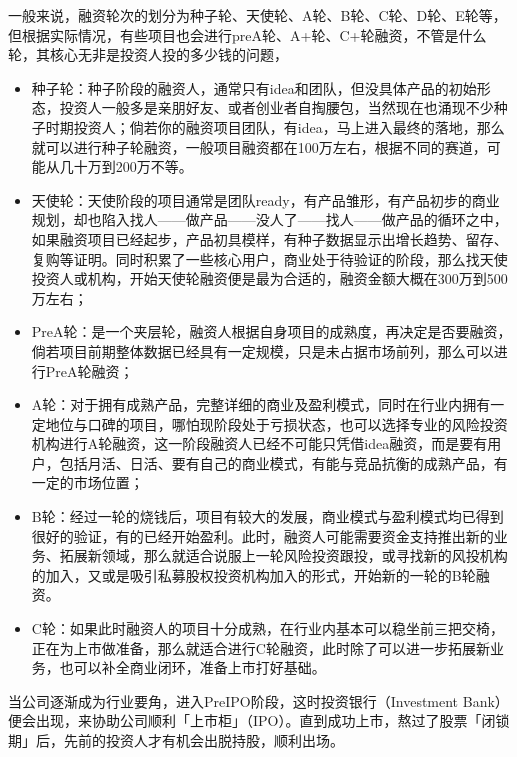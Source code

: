 \documentclass[letterpaper,10pt,english]{sphinxmanual}
\begin{document}
一般来说，融资轮次的划分为种子轮、天使轮、A轮、B轮、C轮、D轮、E轮等，但根据实际情况，有些项目也会进行preA轮、A+轮、C+轮融资，不管是什么轮，其核心无非是投资人投的多少钱的问题，
\begin{itemize}
\item {} 
种子轮：种子阶段的融资人，通常只有idea和团队，但没具体产品的初始形态，投资人一般多是亲朋好友、或者创业者自掏腰包，当然现在也涌现不少种子时期投资人；倘若你的融资项目团队，有idea，马上进入最终的落地，那么就可以进行种子轮融资，一般项目融资都在100万左右，根据不同的赛道，可能从几十万到200万不等。

\item {} 
天使轮：天使阶段的项目通常是团队ready，有产品雏形，有产品初步的商业规划，却也陷入找人——做产品——没人了——找人——做产品的循环之中，如果融资项目已经起步，产品初具模样，有种子数据显示出增长趋势、留存、复购等证明。同时积累了一些核心用户，商业处于待验证的阶段，那么找天使投资人或机构，开始天使轮融资便是最为合适的，融资金额大概在300万到500万左右；

\item {} 
PreA轮：是一个夹层轮，融资人根据自身项目的成熟度，再决定是否要融资，倘若项目前期整体数据已经具有一定规模，只是未占据市场前列，那么可以进行PreA轮融资；

\item {} 
A轮：对于拥有成熟产品，完整详细的商业及盈利模式，同时在行业内拥有一定地位与口碑的项目，哪怕现阶段处于亏损状态，也可以选择专业的风险投资机构进行A轮融资，这一阶段融资人已经不可能只凭借idea融资，而是要有用户，包括月活、日活、要有自己的商业模式，有能与竞品抗衡的成熟产品，有一定的市场位置；

\item {} 
B轮：经过一轮的烧钱后，项目有较大的发展，商业模式与盈利模式均已得到很好的验证，有的已经开始盈利。此时，融资人可能需要资金支持推出新的业务、拓展新领域，那么就适合说服上一轮风险投资跟投，或寻找新的风投机构的加入，又或是吸引私募股权投资机构加入的形式，开始新的一轮的B轮融资。

\item {} 
C轮：如果此时融资人的项目十分成熟，在行业内基本可以稳坐前三把交椅，正在为上市做准备，那么就适合进行C轮融资，此时除了可以进一步拓展新业务，也可以补全商业闭环，准备上市打好基础。

\end{itemize}

当公司逐渐成为行业要角，进入Pre\sphinxhyphen{}IPO阶段，这时投资银行（Investment
Bank）便会出现，来协助公司顺利「上市柜」（IPO）。直到成功上市，熬过了股票「闭锁期」后，先前的投资人才有机会出脱持股，顺利出场。%
\begin{footnote}[152]\sphinxAtStartFootnote
{}
%
\end{footnote}
\end{document}
